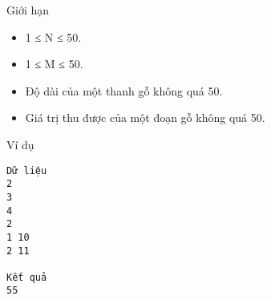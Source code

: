 Giới hạn
\begin{itemize}
	\item     1 ≤ N ≤ 50.   
	\item     1 ≤ M ≤ 50.   
	\item     Độ dài của một thanh gỗ không quá 50.   
	\item     Giá trị thu được của một đoạn gỗ không quá 50.   
\end{itemize}
Ví dụ
\begin{verbatim}
Dữ liệu
2
3
4
2
1 10
2 11

Kết quả
55
\end{verbatim}